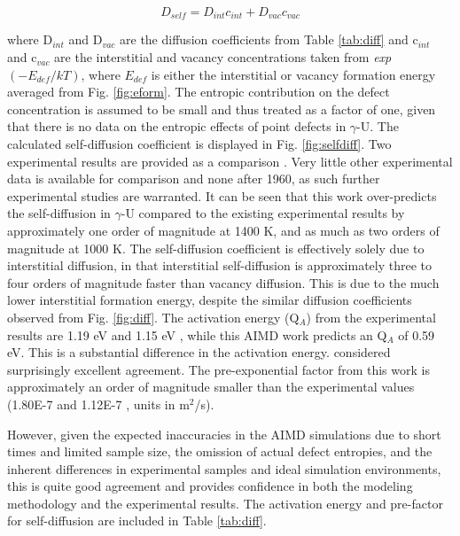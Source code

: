 \documentclass[review]{elsarticle}
\begin{document}
\begin{equation}
\label{eqn:selfd}
D_{self} = D_{int}c_{int} + D_{vac}c_{vac}
\end{equation} 

where D$_{int}$ and D$_{vac}$ are the diffusion coefficients from Table \ref{tab:diff} and c$_{int}$ and c$_{vac}$ are the interstitial and vacancy concentrations taken from \textit{exp}$(-E_{def}/kT)$, where $E_{def}$ is either the interstitial or vacancy formation energy averaged from Fig. \ref{fig:eform}. The entropic contribution on the defect concentration is assumed to be small and thus treated as a factor of one, given that there is no data on the entropic effects of point defects in $\gamma$-U. The calculated self-diffusion coefficient is displayed in Fig. \ref{fig:selfdiff}. Two experimental results are provided as a comparison \cite{rothman1959,adda1959}. Very little other experimental data is available for comparison and none after 1960, as such further experimental studies are warranted. It can be seen that this work over-predicts the self-diffusion in $\gamma$-U compared to the existing experimental results by approximately one order of magnitude at 1400 K, and as much as two orders of magnitude at 1000 K. The self-diffusion coefficient is effectively solely due to interstitial diffusion, in that interstitial self-diffusion is approximately three to four orders of magnitude faster than vacancy diffusion. This is due to the much lower interstitial formation energy, despite the similar diffusion coefficients observed from Fig. \ref{fig:diff}. The activation energy (Q$_A$) from the experimental results are 1.19 eV \cite{adda1959} and 1.15 eV \cite{rothman1959}, while this AIMD work predicts an Q$_A$ of 0.59 eV. This is a substantial difference in the activation energy. considered surprisingly excellent agreement. The pre-exponential factor from this work is approximately an order of magnitude smaller than the experimental values (1.80E-7 \cite{adda1959} and 1.12E-7 \cite{rothman1959}, units in m$^2$/s). 

However, given the expected inaccuracies in the AIMD simulations due to short times and limited sample size, the omission of actual defect entropies, and the inherent differences in experimental samples and ideal simulation environments, this is quite good agreement and provides confidence in both the modeling methodology and the experimental results. The activation energy and pre-factor for self-diffusion are included in Table \ref{tab:diff}.
\end{document}
